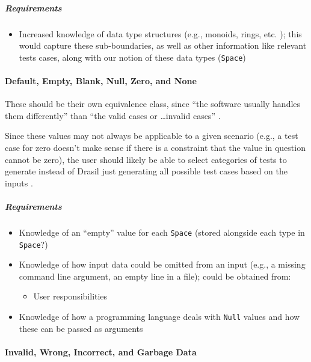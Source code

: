 \subparagraph{Requirements}
\begin{itemize}
      \item Increased knowledge of data type structures (e.g., monoids, rings,
            etc. \cite{june_11_meeting}); this would capture these sub-boundaries,
            as well as other information like relevant tests cases, along with
            our notion of these data types (\texttt{Space})
\end{itemize}

\paragraph{Default, Empty, Blank, Null, Zero, and None
      \cite[p.~77-78]{patton_software_2006}}

These should be their own equivalence class, since ``the software usually
handles them differently'' than ``the valid cases or \dots invalid cases''
\cite[p.~78]{patton_software_2006}.

Since these values may not always be applicable to a given scenario (e.g., a
test case for zero doesn't make sense if there is a constraint that the value
in question cannot be zero), the user should likely be able to select
categories of tests to generate instead of Drasil just generating all possible
test cases based on the inputs \cite{june_11_meeting}.

\subparagraph{Requirements}
\begin{itemize}
      \item Knowledge of an ``empty'' value for each \texttt{Space} (stored
            alongside each type in \texttt{Space}?)
      \item Knowledge of how input data could be omitted from an input
            (e.g., a missing command line argument, an empty line in a file);
            could be obtained from:
            \begin{itemize}
                  \item User responsibilities
            \end{itemize}
      \item Knowledge of how a programming language deals with \texttt{Null}
            values and how these can be passed as arguments
\end{itemize}

\paragraph{Invalid, Wrong, Incorrect, and Garbage Data
      \cite[p.~78-79]{patton_software_2006}}


